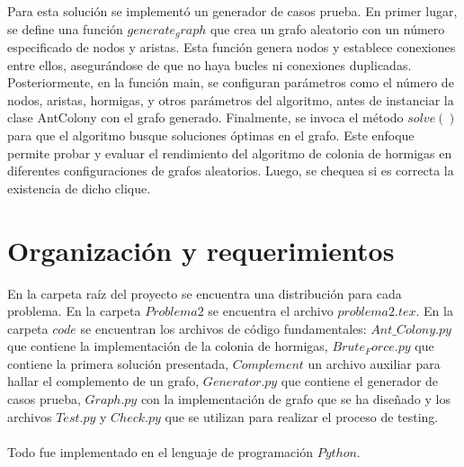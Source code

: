 \documentclass{article}
\begin{document}
Para esta solución se implementó un generador de casos prueba. En primer lugar, se define una función $generate_graph$ que crea un grafo aleatorio con un número especificado de nodos y aristas. Esta función genera nodos y establece conexiones entre ellos, asegurándose de que no haya bucles ni conexiones duplicadas. Posteriormente, en la función main, se configuran parámetros como el número de nodos, aristas, hormigas, y otros parámetros del algoritmo, antes de instanciar la clase AntColony con el grafo generado. Finalmente, se invoca el método $solve()$ para que el algoritmo busque soluciones óptimas en el grafo. Este enfoque permite probar y evaluar el rendimiento del algoritmo de colonia de hormigas en diferentes configuraciones de grafos aleatorios. Luego, se chequea si es correcta la existencia de dicho clique.

\section{Organización y requerimientos}

En la carpeta raíz del proyecto se encuentra una distribución para cada problema. En la carpeta $Problema 2$ se encuentra el archivo $problema2.tex$. En la carpeta $code$ se encuentran los archivos de código fundamentales: $Ant\_Colony.py$ que contiene la implementación de la colonia de hormigas, $Brute_Force.py$ que contiene la primera solución presentada, $Complement$ un archivo auxiliar para hallar el complemento de un grafo, $Generator.py$ que contiene el generador de casos prueba, $Graph.py$ con la implementación de grafo que se ha diseñado y los archivos $Test.py$ y $Check.py$ que se utilizan para realizar el proceso de testing.
\\
\\
Todo fue implementado en el lenguaje de programación $Python$.
\end{document}
